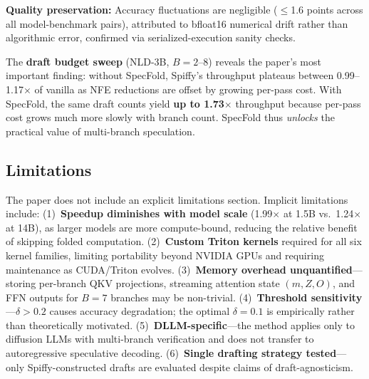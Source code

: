 \documentclass[11pt,a4paper]{article}
\begin{document}
\textbf{Quality preservation:} Accuracy fluctuations are negligible ($\leq$1.6 points across all model-benchmark pairs), attributed to bfloat16 numerical drift rather than algorithmic error, confirmed via serialized-execution sanity checks.

The \textbf{draft budget sweep} (NLD-3B, $B{=}2$--$8$) reveals the paper's most important finding: without SpecFold, Spiffy's throughput plateaus between 0.99--1.17$\times$ of vanilla as NFE reductions are offset by growing per-pass cost. With SpecFold, the same draft counts yield \textbf{up to 1.73$\times$} throughput because per-pass cost grows much more slowly with branch count. SpecFold thus \emph{unlocks} the practical value of multi-branch speculation.

\subsection{Limitations}
The paper does not include an explicit limitations section. Implicit limitations include: (1)~\textbf{Speedup diminishes with model scale} (1.99$\times$ at 1.5B vs.\ 1.24$\times$ at 14B), as larger models are more compute-bound, reducing the relative benefit of skipping folded computation. (2)~\textbf{Custom Triton kernels} required for all six kernel families, limiting portability beyond NVIDIA GPUs and requiring maintenance as CUDA/Triton evolves. (3)~\textbf{Memory overhead unquantified}---storing per-branch QKV projections, streaming attention state $(m, Z, O)$, and FFN outputs for $B{=}7$ branches may be non-trivial. (4)~\textbf{Threshold sensitivity}---$\delta > 0.2$ causes accuracy degradation; the optimal $\delta{=}0.1$ is empirically rather than theoretically motivated. (5)~\textbf{DLLM-specific}---the method applies only to diffusion LLMs with multi-branch verification and does not transfer to autoregressive speculative decoding. (6)~\textbf{Single drafting strategy tested}---only Spiffy-constructed drafts are evaluated despite claims of draft-agnosticism.
\end{document}
